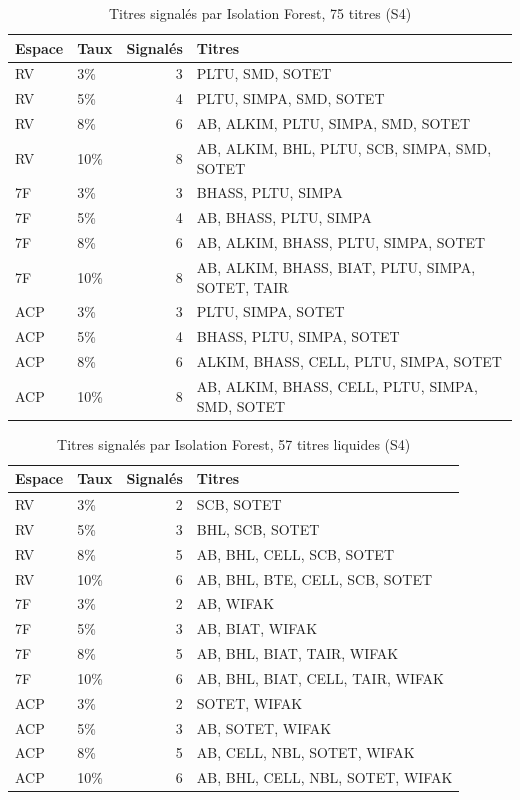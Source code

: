 \begin{table}[H]\centering\small
\caption{Titres signalés par Isolation Forest, 75 titres (S4)}\label{tab:annexe-if75}
\begin{tabular}{llrp{9cm}}\toprule
Espace & Taux & Signalés & Titres \\ \midrule
RV & 3\% & 3 & PLTU, SMD, SOTET \\
RV & 5\% & 4 & PLTU, SIMPA, SMD, SOTET \\
RV & 8\% & 6 & AB, ALKIM, PLTU, SIMPA, SMD, SOTET \\
RV & 10\% & 8 & AB, ALKIM, BHL, PLTU, SCB, SIMPA, SMD, SOTET \\
7F & 3\% & 3 & BHASS, PLTU, SIMPA \\
7F & 5\% & 4 & AB, BHASS, PLTU, SIMPA \\
7F & 8\% & 6 & AB, ALKIM, BHASS, PLTU, SIMPA, SOTET \\
7F & 10\% & 8 & AB, ALKIM, BHASS, BIAT, PLTU, SIMPA, SOTET, TAIR \\
ACP & 3\% & 3 & PLTU, SIMPA, SOTET \\
ACP & 5\% & 4 & BHASS, PLTU, SIMPA, SOTET \\
ACP & 8\% & 6 & ALKIM, BHASS, CELL, PLTU, SIMPA, SOTET \\
ACP & 10\% & 8 & AB, ALKIM, BHASS, CELL, PLTU, SIMPA, SMD, SOTET \\
\bottomrule\end{tabular}\end{table}
\begin{table}[H]\centering\small
\caption{Titres signalés par Isolation Forest, 57 titres liquides (S4)}\label{tab:annexe-if57}
\begin{tabular}{llrp{9cm}}\toprule
Espace & Taux & Signalés & Titres \\ \midrule
RV & 3\% & 2 & SCB, SOTET \\
RV & 5\% & 3 & BHL, SCB, SOTET \\
RV & 8\% & 5 & AB, BHL, CELL, SCB, SOTET \\
RV & 10\% & 6 & AB, BHL, BTE, CELL, SCB, SOTET \\
7F & 3\% & 2 & AB, WIFAK \\
7F & 5\% & 3 & AB, BIAT, WIFAK \\
7F & 8\% & 5 & AB, BHL, BIAT, TAIR, WIFAK \\
7F & 10\% & 6 & AB, BHL, BIAT, CELL, TAIR, WIFAK \\
ACP & 3\% & 2 & SOTET, WIFAK \\
ACP & 5\% & 3 & AB, SOTET, WIFAK \\
ACP & 8\% & 5 & AB, CELL, NBL, SOTET, WIFAK \\
ACP & 10\% & 6 & AB, BHL, CELL, NBL, SOTET, WIFAK \\
\bottomrule\end{tabular}\end{table}
